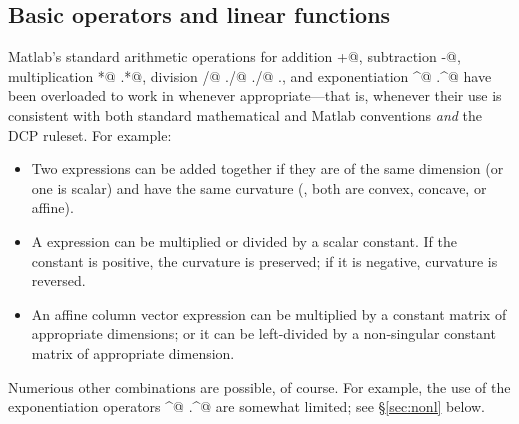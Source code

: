 \documentclass[12pt]{article}
\begin{document}
\subsection{Basic operators and linear functions}

Matlab's standard arithmetic operations for
addition \verb@+@, subtraction \verb@-@, multiplication
\verb@*@ \verb@.*@, division \verb@/@ \verb@\@ \verb@./@
\verb@./@ \verb@.\@, and exponentiation \verb@^@ \verb@.^@
have been overloaded to work in \cvx whenever appropriate---that
is, whenever their use is consistent with both standard mathematical
and Matlab conventions \emph{and} the DCP ruleset.
For example:
\begin{itemize}
\item Two \cvx expressions can be added together if they are of the same
      dimension (or one is scalar) and have the same curvature (\ie, 
      both are convex, concave, or affine).
\item A \cvx expression can be multiplied or divided by a scalar constant. If the
      constant is positive, the curvature is preserved; if it is negative,
      curvature is reversed.      
\item An affine column vector \cvx expression can be multiplied by a constant matrix
      of appropriate dimensions; or it can be left-divided by a non-singular 
      constant matrix of appropriate dimension.
\end{itemize}
Numerious other combinations are possible, of course.
For example, the use of the exponentiation operators \verb@^@
\verb@.^@ are somewhat limited; see \S\ref{sec:nonl} below.
\end{document}
